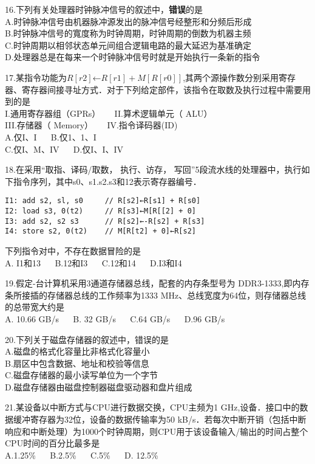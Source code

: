 16.下列有关处理器时钟脉冲信号的叙述中，\textbf{错误}的是 \\
A.时钟脉冲信号由机器脉冲源发出的脉冲信号经整形和分频后形成 \\
B.时钟脉冲信号的寬度称为时钟周期，时钟周期的倒数为机器主频 \\
C.时钟周期以相邻状态单元间组合逻辑电路的最大延迟为基准确定 \\
D.处理器总是在每来一个时钟脉冲信号时就是开始执行一条新的指令

17.某指令功能为$R[r2]$←$R[r1]+M[R[r0]]$,其两个源操作数分别采用寄存器、寄存器间接寻址方式．对于下列给定部件，该指令在取数及执行过程中需要用到的是 \\
I.通用寄存器组（GPRs） $\quad$ II.算术逻辑单元（ ALU） \\
III.存储器（ Memory） $\quad$ IV.指令译码器(ID) \\
A.仅I、I $\quad$ B.仅1、1、I \\
C.仅I、M、IV $\quad$ D.仅I、I、IV

18.在采用“取指、译码/取数， 执行、访存， 写回”5段流水线的处理器中，执行如下指令序列，其中s0、s1.s2.s3和12表示寄存器编号． \\
\begin{lstlisting}
I1: add s2, sl, s0     // R[s2]←R[s1] + R[s0]
I2: load s3, 0(t2)     // R[s3]←M[R[[2] + 0]
I3: add s2, s2 s3      // R[s2]←-R[s2] + R[s3]
I4: store s2, 0(t2)    // M[R[t2] + 0]←R[s2]
\end{lstlisting}
下列指令对中，不存在数据冒险的是 \\
A. I1和13 $\quad$ B.12和I3 $\quad$ C.12和14 $\quad$ D.I3和I4

19.假定-台计算机采用3通道存储器总线，配套的内存条型号为
DDR3-1333,即内存条所接插的存储器总线的工作频率为1333
MHz、总线宽度为64位，则存储器总线的总带宽大约是 \\
A. 10.66 GB/s $\quad$ B. 32 GB/s $\quad$ C.64 GB/s $\quad$ D.96 GB/s

20.下列关于磁盘存储器的叙述中，错误的是 \\
A.磁盘的格式化容量比非格式化容量小 \\
B.扇区中包含数据、地址和校验等信息 \\
C.磁盘存储器的最小读写单位为一个字节 \\
D.磁盘存储器由磁盘控制器磁盘驱动器和盘片组成

21.某设备以中断方式与CPU进行数据交换，CPU主频为1 GHz,设备．接口中的数据缓冲寄存器为32位，设备的数据传输率为50 kB/s．若每次中断开销（包括中断响应和中断处理）为1000个时钟周期，则CPU用于该设备输入/输出的时间占整个CPU时间的百分比最多是 \\
A.1.25\% $\quad$ B.2.5\% $\quad$ C.5\% $\quad$ D. 12.5\%

